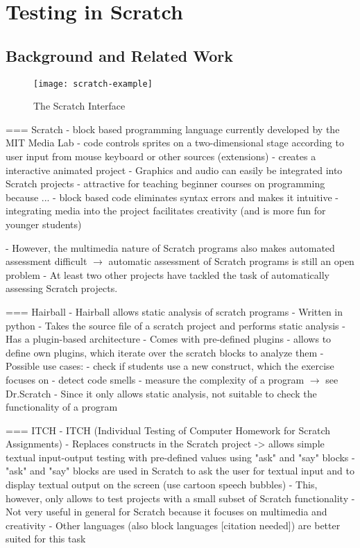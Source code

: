 \chapter{Testing in Scratch}

\section{Background and Related Work}

\begin{wrapfigure}{r}{0.5\textwidth}
    \centering
    \texttt{[image: scratch-example]}
    \caption{The Scratch Interface}
    \label{fig:the_scratch_interface}
\end{wrapfigure}
=== Scratch
- block based programming language currently developed by the MIT Media Lab \cite{scratch}
- code controls sprites on a two-dimensional stage according to user input from mouse keyboard or other sources (extensions)
- creates a interactive animated project
- Graphics and audio can easily be integrated into Scratch projects
- attractive for teaching beginner courses on programming because ...
    - block based code eliminates syntax errors and makes it intuitive
    - integrating media into the project facilitates creativity (and is more fun for younger students)

- However, the multimedia nature of Scratch programs also makes automated assessment difficult
$\rightarrow$ automatic assessment of Scratch programs is still an open problem
- At least two other projects have tackled the task of automatically assessing Scratch projects.

=== Hairball
- Hairball \cite{hairball} allows static analysis of scratch programs
- Written in python
- Takes the source file of a scratch project and performs static analysis
- Has a plugin-based architecture
    - Comes with pre-defined plugins
    - allows to define own plugins, which iterate over the scratch blocks to analyze them
- Possible use cases:
    - check if students use a new construct, which the exercise focuses on
    - detect code smells
    - measure the complexity of a program $\rightarrow$ see Dr.Scratch
- Since it only allows static analysis, not suitable to check the functionality of a program

=== ITCH
- ITCH (Individual Testing of Computer Homework for Scratch Assignments) \cite{itch}
- Replaces constructs in the Scratch project
    -> allows simple textual input-output testing with pre-defined values using "ask" and "say" blocks
    - "ask" and "say" blocks are used in Scratch to ask the user for textual input and to display textual output on the screen
      (use cartoon speech bubbles)
- This, however,  only allows to test projects with a small subset of Scratch functionality
- Not very useful in general for Scratch because it focuses on multimedia and creativity
- Other languages (also block languages [citation needed]) are better suited for this task

